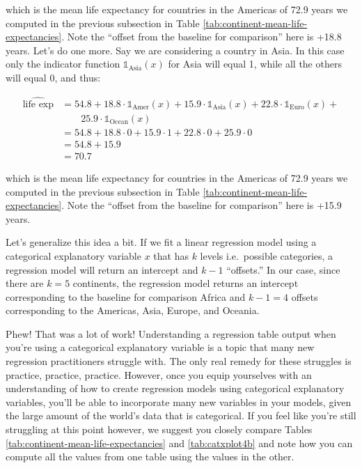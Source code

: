\documentclass[12pt, krantz2,]{krantz}
\begin{document}
which is the mean life expectancy for countries in the Americas of 72.9 years we computed in the previous subsection in Table \ref{tab:continent-mean-life-expectancies}. Note the ``offset from the baseline for comparison'' here is +18.8 years. Let's do one more. Say we are considering a country in Asia. In this case only the indicator function \(\mathbb{1}_{\mbox{Asia}}(x)\) for Asia will equal 1, while all the others will equal 0, and thus:

\[
\begin{aligned}
\widehat{\text{life exp}} &= 54.8 + 18.8\cdot\mathbb{1}_{\mbox{Amer}}(x) + 15.9\cdot\mathbb{1}_{\mbox{Asia}}(x)
+ 22.8\cdot\mathbb{1}_{\mbox{Euro}}(x) + \\
& \qquad 25.9\cdot\mathbb{1}_{\mbox{Ocean}}(x)\\
&= 54.8 + 18.8\cdot 0 + 15.9\cdot 1 + 22.8\cdot 0 + 25.9\cdot 0\\
&= 54.8 + 15.9\\
&= 70.7
\end{aligned}
\]

which is the mean life expectancy for countries in the Americas of 72.9 years we computed in the previous subsection in Table \ref{tab:continent-mean-life-expectancies}. Note the ``offset from the baseline for comparison'' here is +15.9 years.

Let's generalize this idea a bit. If we fit a linear regression model using a categorical explanatory variable \(x\) that has \(k\) levels i.e.~possible categories, a regression model will return an intercept and \(k - 1\) ``offsets.'' In our case, since there are \(k = 5\) continents, the regression model returns an intercept corresponding to the baseline for comparison Africa and \(k - 1 = 4\) offsets corresponding to the Americas, Asia, Europe, and Oceania.

Phew! That was a lot of work! Understanding a regression table output when you're using a categorical explanatory variable is a topic that many new regression practitioners struggle with. The only real remedy for these struggles is practice, practice, practice. However, once you equip yourselves with an understanding of how to create regression models using categorical explanatory variables, you'll be able to incorporate many new variables in your models, given the large amount of the world's data that is categorical. If you feel like you're still struggling at this point however, we suggest you closely compare Tables \ref{tab:continent-mean-life-expectancies} and \ref{tab:catxplot4b} and note how you can compute all the values from one table using the values in the other.
\end{document}

